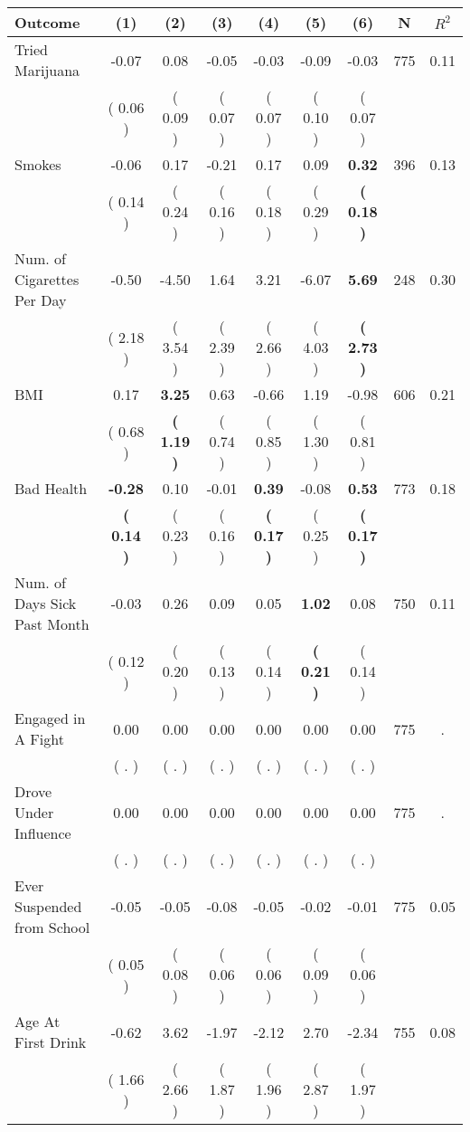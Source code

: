 \begin{tabular}{lcccccccc}
\toprule
 \textbf{Outcome} & \textbf{(1)} & \textbf{(2)} & \textbf{(3)} & \textbf{(4)} & \textbf{(5)} & \textbf{(6)} & \textbf{N} & \textbf{$ R^2$} \\
\midrule
Tried Marijuana &     -0.07 &      0.08 &     -0.05 &     -0.03 &     -0.09 &     -0.03 & 775 &       0.11 \\ 
 & (     0.06 ) & (     0.09 ) & (     0.07 ) & (     0.07 ) & (     0.10 ) & (     0.07 ) & \\
Smokes &     -0.06 &      0.17 &     -0.21 &      0.17 &      0.09 & \textbf{     0.32} & 396 &       0.13 \\ 
 & (     0.14 ) & (     0.24 ) & (     0.16 ) & (     0.18 ) & (     0.29 ) & \textbf{(     0.18 )} & \\
Num. of Cigarettes Per Day &     -0.50 &     -4.50 &      1.64 &      3.21 &     -6.07 & \textbf{     5.69} & 248 &       0.30 \\ 
 & (     2.18 ) & (     3.54 ) & (     2.39 ) & (     2.66 ) & (     4.03 ) & \textbf{(     2.73 )} & \\
BMI &      0.17 & \textbf{     3.25} &      0.63 &     -0.66 &      1.19 &     -0.98 & 606 &       0.21 \\ 
 & (     0.68 ) & \textbf{(     1.19 )} & (     0.74 ) & (     0.85 ) & (     1.30 ) & (     0.81 ) & \\
Bad Health & \textbf{    -0.28} &      0.10 &     -0.01 & \textbf{     0.39} &     -0.08 & \textbf{     0.53} & 773 &       0.18 \\ 
 & \textbf{(     0.14 )} & (     0.23 ) & (     0.16 ) & \textbf{(     0.17 )} & (     0.25 ) & \textbf{(     0.17 )} & \\
Num. of Days Sick Past Month &     -0.03 &      0.26 &      0.09 &      0.05 & \textbf{     1.02} &      0.08 & 750 &       0.11 \\ 
 & (     0.12 ) & (     0.20 ) & (     0.13 ) & (     0.14 ) & \textbf{(     0.21 )} & (     0.14 ) & \\
Engaged in A Fight &      0.00 &      0.00 &      0.00 &      0.00 &      0.00 &      0.00 & 775 &          . \\ 
 & (        . ) & (        . ) & (        . ) & (        . ) & (        . ) & (        . ) & \\
Drove Under Influence &      0.00 &      0.00 &      0.00 &      0.00 &      0.00 &      0.00 & 775 &          . \\ 
 & (        . ) & (        . ) & (        . ) & (        . ) & (        . ) & (        . ) & \\
Ever Suspended from School &     -0.05 &     -0.05 &     -0.08 &     -0.05 &     -0.02 &     -0.01 & 775 &       0.05 \\ 
 & (     0.05 ) & (     0.08 ) & (     0.06 ) & (     0.06 ) & (     0.09 ) & (     0.06 ) & \\
Age At First Drink &     -0.62 &      3.62 &     -1.97 &     -2.12 &      2.70 &     -2.34 & 755 &       0.08 \\ 
 & (     1.66 ) & (     2.66 ) & (     1.87 ) & (     1.96 ) & (     2.87 ) & (     1.97 ) & \\
\bottomrule
\end{tabular}
